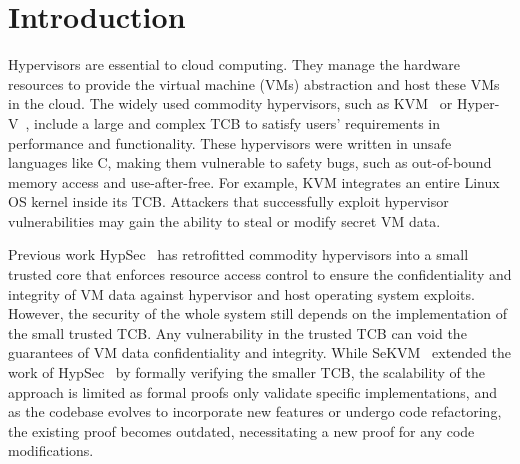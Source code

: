 
\chapter{Introduction}

Hypervisors are essential to cloud computing. They manage the hardware
resources to provide the virtual machine (VMs) abstraction and host
these VMs in the cloud.
The widely used commodity
hypervisors, such as KVM~\cite{kivity07kvm} or Hyper-V~\cite{hyperv},
include a large and complex TCB to satisfy users' requirements in
performance and functionality. These hypervisors were written in unsafe
languages like C, making them vulnerable to safety bugs, such as
out-of-bound memory access and use-after-free. For example, KVM
integrates an entire Linux OS kernel inside its TCB. Attackers that
successfully exploit hypervisor vulnerabilities may gain the ability
to steal or modify secret VM data.

Previous work HypSec~\cite{hypsec} has retrofitted commodity hypervisors into a
small trusted core that enforces resource access control to ensure the
confidentiality and integrity of VM data against hypervisor and host operating
system exploits. However, the security of the whole system still depends on the
implementation of the small trusted TCB. Any vulnerability in the trusted TCB
can void the guarantees of VM data confidentiality and integrity.
While SeKVM~\cite{sekvm} extended the work of HypSec~\cite{hypsec} by formally
verifying the smaller TCB, the scalability of the approach is limited as formal
proofs only validate specific implementations, and as the codebase evolves to
incorporate new features or undergo code refactoring, the existing proof
becomes outdated, necessitating a new proof for any code modifications.

